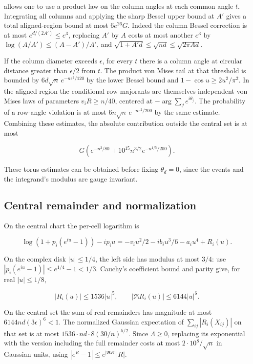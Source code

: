 \documentclass[11pt]{article}
\begin{document}
allows one to use a product law on the column angles at each common angle $t$. Integrating all columns and applying the sharp Bessel upper bound at $A'$ gives a total aligned-region bound at most $6e^{26}G$. Indeed the column Bessel correction is at most $e^{d/(2A')}\le e^3$, replacing $A'$ by $A$ costs at most another $e^3$ by $\log(A/A')\le(A-A')/A'$, and $\sqrt{1+A'd}\le\sqrt{nd}\le\sqrt{2\pi Ad}$.

If the column diameter exceeds $\epsilon$, for every $t$ there is a column angle at circular distance greater than $\epsilon/2$ from $t$. The product von Mises tail at that threshold is bounded by $6d\sqrt n\,e^{-n\epsilon^2/120}$ by the lower Bessel bound and $1-\cos u\ge2u^2/\pi^2$. In the aligned region the conditional row majorants are themselves independent von Mises laws of parameters $v_iR\ge n/40$, centered at $-\arg\sum_j e^{i\theta_j}$. The probability of a row-angle violation is at most $6n\sqrt n\,e^{-n\epsilon^2/200}$ by the same estimate. Combining these estimates, the absolute contribution outside the central set is at most

\[
G\left(e^{-n^2/80}+10^{15}n^{3/2}e^{-n^{1/5}/200}\right).
\]

These torus estimates can be obtained before fixing $\theta_d=0$, since the events and the integrand's modulus are gauge invariant.

\subsection{Central remainder and normalization}

On the central chart the per-cell logarithm is

\[
\log(1+p_i(e^{iu}-1))-ip_i u
=-v_i u^2/2-i b_i u^3/6-a_i u^4+R_i(u).
\]

On the complex disk $|u|\le1/4$, the left side has modulus at most $3/4$: use $|p_i(e^{iu}-1)|\le e^{1/4}-1<1/3$. Cauchy's coefficient bound and parity give, for real $|u|\le1/8$,

\[
|R_i(u)|\le1536|u|^5,\qquad |\Re R_i(u)|\le6144|u|^6 .
\]

On the central set the sum of real remainders has magnitude at most $6144nd(3\epsilon)^6<1$. The normalized Gaussian expectation of $\sum_{ij}|R_i(X_{ij})|$ on that set is at most $1536\cdot nd\cdot8(30/n)^{5/2}$. Since $\Lambda\ge0$, replacing its exponential with the version including the full remainder costs at most $2\cdot10^8/\sqrt n$ in Gaussian units, using $|e^{R}-1|\le e^{|\Re R|}|R|$.
\end{document}
